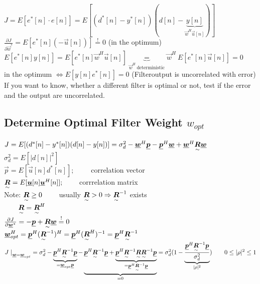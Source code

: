 \begin{doublespace}

$J=E[e^*[n]\cdot e[n]] = E[(d^*[n] - y^*[n])(d[n]-\underbrace{y[n]}_{\vec{w}^H\vec{u}[n]})]$\\
$\frac{\partial J}{\partial \vec{w}^*} = E[e^*[n](-\vec{u}[n])] \stackrel{!}{=} 0$ (in the optimum)\\
$E[e^*[n]y[n]] = E[e^*[n]\vec{w}^H\vec{u}[n]] \underbrace{=}_{\vec{w}^H\ \text{deterministic}} \vec{w}^H\ E[e^*[n]\vec{u}[n]]=0$\\
in the optimum $\Leftrightarrow E[y[n]e^*[n]] = 0$ (Filteroutput is uncorrelated with error)\\
If you want to know, whether  a different filter is optimal or not, test if the error and the output are uncorrelated.

\subsection{Determine Optimal Filter Weight \texorpdfstring{$w_{opt}$}{w-opt}}
$J=E[(d^*[n] - y^*[n])(d[n]-y[n])] = \sigma_d^2 - \vec{w}^H\vec{p} - \vec{p}^H \vec{w} + \vec{w}^H \ma{R}\vec{w}$\\
$\sigma_d^2 = E[|d[n]|^2]$\\
$\vec{p} = E[\vec{u}[n]d^*[n]]; \qquad$ correlation vector\\
$\ma{R} = E[\vec{u}[n]\vec{u}^H[n]]; \qquad$ corrrelation matrix\\
Note: $\ma{R}\geq 0 \qquad$ usually $\ma{R}>0 \Rightarrow \ma{R}^{-1}$ exists\\$\qquad \ma{R}=\ma{R}^H$\\
$\frac{\partial J}{\partial \vec{w}^*}=-\vec{p} + \ma{R}\vec{w} \stackrel{!}{=} 0$\\
$\vec{w}^H_{opt} = \vec{p}^H(\ma{R}^{-1})^H = \vec{p}^H(\ma{R}^{H})^{-1} = \vec{p}^H\ma{R}^{-1}$\\
$J\left.\right|_{\vec{w}=\vec{w}_{opt}}= \sigma_d^2 - \underbrace{\vec{p}^H\ma{R}^{-1}\vec{p}}_{=\vec{w}_{opt}\vec{p}} - \underbrace{\vec{p}^H\ma{R}^{-1}\vec{p} + \underbrace{\vec{p}^H\ma{R}^{-1}\ma{R}\ma{R}^{-1}\vec{p}}_{=\vec{p}^H\ma{R}^{-1}\vec{p}}}_{=0} = \sigma_d^2(1-\underbrace{\frac{\vec{p}^H\ma{R}^{-1}\vec{p}}{\sigma_d^2}}_{|\rho|^2}) \qquad 0\leq|\rho|^2\leq 1$
\end{doublespace}


